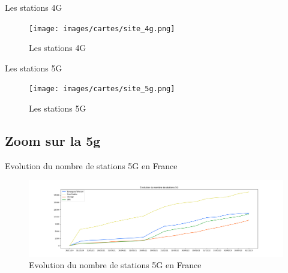 \begin{frame}{Les stations 4G}
    \begin{figure}
        \texttt{[image: images/cartes/site\_4g.png]}
        \caption{\label{fig:sp-4g}Les stations 4G}
    \end{figure}
\end{frame}

\begin{frame}{Les stations 5G}
    \begin{figure}
        \texttt{[image: images/cartes/site\_5g.png]}
        \caption{\label{fig:sp-5g}Les stations 5G}
    \end{figure}
\end{frame}


\subsection{Zoom sur la 5g}
\insertsubsectionframe

\begin{frame}{Evolution du nombre de stations 5G en France}
    \begin{figure}
        \includegraphics[height=0.5\paperheight]{images/5g-evolution.png}
        \caption{\label{fig:5g-ev}Evolution du nombre de stations 5G en France}
    \end{figure}
\end{frame}



